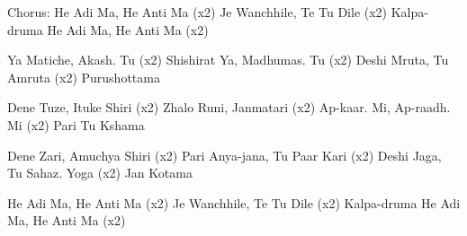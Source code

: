     \beginchorus{}
        Chorus:
        He Adi Ma, He Anti Ma (x2)
        Je Wanchhile, Te Tu Dile (x2)
        Kalpa-druma
        He Adi Ma, He Anti Ma (x2)
    \endchorus{}

    \beginverse{}
        Ya Matiche, Akash. Tu (x2)
        Shishirat Ya, Madhumas. Tu (x2)
        Deshi Mruta, Tu Amruta (x2)
        Purushottama
    \endverse{}

    \beginverse{}
        Dene Tuze, Ituke Shiri (x2)
        Zhalo Runi, Janmatari (x2)
        Ap-kaar. Mi, Ap-raadh. Mi (x2)
        Pari Tu Kshama
    \endverse{}

    \beginverse{}
        Dene Zari, Amuchya Shiri (x2)
        Pari Anya-jana, Tu Paar Kari (x2)
        Deshi Jaga, Tu Sahaz. Yoga (x2)
        Jan Kotama
    \endverse{}

    \beginverse{}
        He Adi Ma, He Anti Ma (x2)
        Je Wanchhile, Te Tu Dile (x2)
        Kalpa-druma
        He Adi Ma, He Anti Ma (x2)
    \endverse{}
\endsong{}

\newpage